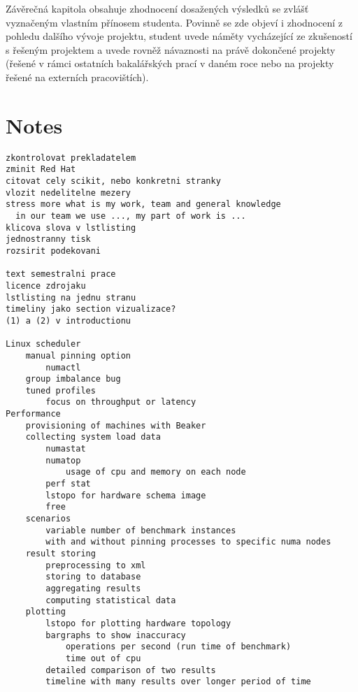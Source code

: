 Závěrečná kapitola obsahuje zhodnocení dosažených výsledků se zvlášť vyznačeným
vlastním přínosem studenta. Povinně se zde objeví i zhodnocení z pohledu dalšího
vývoje projektu, student uvede náměty vycházející ze zkušeností s řešeným
projektem a uvede rovněž návaznosti na právě dokončené projekty (řešené v rámci
ostatních bakalářských prací v daném roce nebo na projekty řešené na externích
pracovištích).


\chapter{Notes}
\begin{verbatim}
zkontrolovat prekladatelem
zminit Red Hat
citovat cely scikit, nebo konkretni stranky
vlozit nedelitelne mezery
stress more what is my work, team and general knowledge
  in our team we use ..., my part of work is ...
klicova slova v lstlisting
jednostranny tisk
rozsirit podekovani

text semestralni prace
licence zdrojaku
lstlisting na jednu stranu
timeliny jako section vizualizace?
(1) a (2) v introductionu

Linux scheduler
    manual pinning option
        numactl
    group imbalance bug
    tuned profiles
        focus on throughput or latency
Performance
    provisioning of machines with Beaker
    collecting system load data
        numastat
        numatop
            usage of cpu and memory on each node
        perf stat
        lstopo for hardware schema image
        free
    scenarios
        variable number of benchmark instances
        with and without pinning processes to specific numa nodes
    result storing
        preprocessing to xml
        storing to database
        aggregating results
        computing statistical data
    plotting
        lstopo for plotting hardware topology
        bargraphs to show inaccuracy
            operations per second (run time of benchmark)
            time out of cpu
        detailed comparison of two results
        timeline with many results over longer period of time
\end{verbatim}